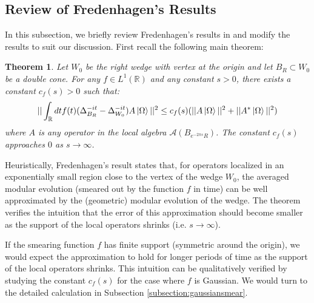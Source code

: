 \documentclass[a4paper,11pt]{article}
\newtheorem{theorem}{Theorem}
\theoremstyle{definition}
\begin{document}
\subsection{Review of Fredenhagen's Results}
In this subsection, we briefly review Fredenhagen's results in \cite{fredenhagen} and modify the results to suit our discussion. First recall the following main theorem:
\begin{theorem}
    Let $W_0$ be the right wedge with vertex at the origin and let $B_R\subset W_0$ be a double cone. For any $f\in L^1(\mathbb{R})$ and any constant $s > 0$, there exists a constant $c_f(s) > 0$ such that:
    \begin{equation}
        ||\int_\mathbb{R} dt f(t)(\Delta_{B_R}^{-it} - \Delta_{W_0}^{-it})A\ket{\Omega}||^2 \leq c_f(s)(||A\ket{\Omega}||^2 + ||A^*\ket{\Omega}||^2)
    \end{equation}
    where $A$ is any operator in the local algebra $\mathcal{A}(B_{e^{-2\pi s}R})$. The constant $c_f(s)$ approaches $0$ as $s\rightarrow \infty$.
\end{theorem}
Heuristically, Fredenhagen's result states that, for operators localized in an exponentially small region close to the vertex of the wedge $W_0$, the averaged modular evolution (smeared out by the function $f$ in time) can be well approximated by the (geometric) modular evolution of the wedge. The theorem verifies the intuition that the error of this approximation should become smaller as the support of the local operators shrinks (i.e. $s\rightarrow\infty$).

If the smearing function $f$ has finite support (symmetric around the origin), we would expect the approximation to hold for longer periods of time as the support of the local operators shrinks. This intuition can be qualitatively verified by studying the constant $c_f(s)$ for the case where $f$ is Gaussian. We would turn to the detailed calculation in Subsection \ref{subsection:gaussiansmear}.
\end{document}
